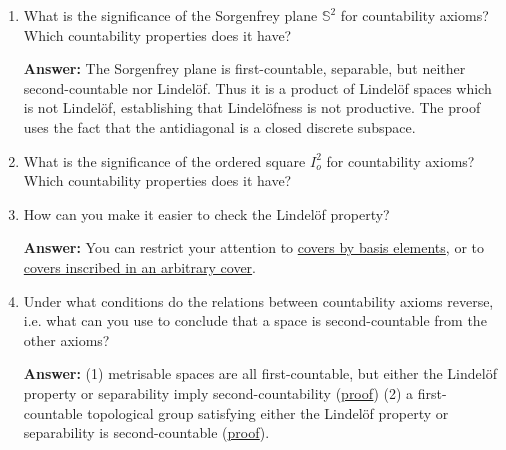 \begin{enumerate}
    \item What is the significance of the Sorgenfrey plane \( \mathbb{S}^2 \) for countability axioms? Which countability properties does it have?

        \textbf{Answer:}  The Sorgenfrey plane is first-countable, separable, but neither second-countable nor Lindel\"of. Thus it is a product of Lindel\"of spaces which is not Lindel\"of, establishing that Lindel\"ofness is not productive. The proof uses the fact that the antidiagonal is a closed discrete subspace.

    \item What is the significance of the ordered square \( I_o^2 \) for countability axioms? Which countability properties does it have?
    \item How can you make it easier to check the Lindel\"of property?

        \textbf{Answer: } You can restrict your attention to \hyperlink{LindelofByBasis}{covers by basis elements}, or to \hyperlink{LindelofByInscription}{covers inscribed in an arbitrary cover}.
    \item Under what conditions do the relations between countability axioms reverse, i.e. what can you use to conclude that a space is second-countable from the other axioms?
    
        \textbf{Answer:} (1) metrisable spaces are all first-countable, but either the Lindel\"of property or separability imply second-countability (\hyperlink{MetrisableSpaceCountabilityProperties}{proof}) (2) a first-countable topological group satisfying either the Lindel\"of property or separability is second-countable (\hyperlink{MunkresP30.18}{proof}).
\end{enumerate}

